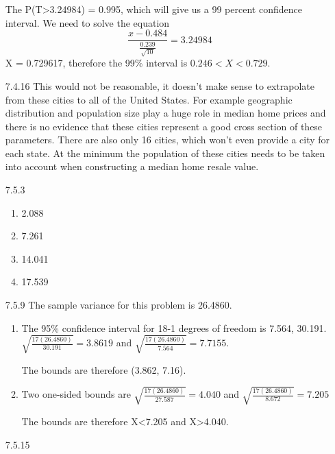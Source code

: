 \documentclass[11pt,fleqn]{article}
\begin{document}
\begin{enumerate}
The P(T>3.24984) = 0.995, which will give us a 99 percent confidence interval.
We need to solve the equation 
\[
\frac{x-0.484}{\frac{0.239}{\sqrt{10}}} = 3.24984
\]
X = 0.729617, therefore the 99\% interval is $0.246<X<0.729$.
\item[7.4.16]
This would not be reasonable, it doesn't make sense to extrapolate from these
cities to all of the United States. For example geographic distribution and
population size play a huge role in median home prices and there is no
evidence that these cities represent a good cross section of these parameters.
There are also only 16 cities, which won't even provide a city for each state.
At the minimum the population of these cities needs to be taken into account
when constructing a median home resale value. 
\item[7.5.3]
\begin{enumerate}
  \item 2.088
  \item 7.261
  \item 14.041
  \item 17.539
\end{enumerate}
\item[7.5.9]
The sample variance for this problem is 26.4860. 
\begin{enumerate}
  \item
  The 95\% confidence interval for 18-1 degrees of freedom is 7.564, 30.191. 
  $\sqrt{\displaystyle\frac{17(26.4860)}{30.191}} = 3.8619$ and
  $\sqrt{\displaystyle\frac{17(26.4860)}{7.564}} = 7.7155$. 
  
  The bounds are therefore (3.862, 7.16). 
  \item
  Two one-sided bounds are  
  $\sqrt{\displaystyle\frac{17(26.4860)}{27.587}} = 4.040$ and
  $\sqrt{\displaystyle\frac{17(26.4860)}{8.672}} = 7.205$
  
  The bounds are therefore X<7.205 and X>4.040. 
\end{enumerate}
\item[7.5.15] 

 
\end{enumerate}
\end{document}
